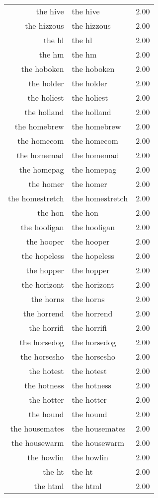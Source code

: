 \begin{table}[ht]
\begin{tabular}{rlr}
  the hive & the hive & 2.00 \\ 
  the hizzous & the hizzous & 2.00 \\ 
  the hl & the hl & 2.00 \\ 
  the hm & the hm & 2.00 \\ 
  the hoboken & the hoboken & 2.00 \\ 
  the holder & the holder & 2.00 \\ 
  the holiest & the holiest & 2.00 \\ 
  the holland & the holland & 2.00 \\ 
  the homebrew & the homebrew & 2.00 \\ 
  the homecom & the homecom & 2.00 \\ 
  the homemad & the homemad & 2.00 \\ 
  the homepag & the homepag & 2.00 \\ 
  the homer & the homer & 2.00 \\ 
  the homestretch & the homestretch & 2.00 \\ 
  the hon & the hon & 2.00 \\ 
  the hooligan & the hooligan & 2.00 \\ 
  the hooper & the hooper & 2.00 \\ 
  the hopeless & the hopeless & 2.00 \\ 
  the hopper & the hopper & 2.00 \\ 
  the horizont & the horizont & 2.00 \\ 
  the horns & the horns & 2.00 \\ 
  the horrend & the horrend & 2.00 \\ 
  the horrifi & the horrifi & 2.00 \\ 
  the horsedog & the horsedog & 2.00 \\ 
  the horsesho & the horsesho & 2.00 \\ 
  the hotest & the hotest & 2.00 \\ 
  the hotness & the hotness & 2.00 \\ 
  the hotter & the hotter & 2.00 \\ 
  the hound & the hound & 2.00 \\ 
  the housemates & the housemates & 2.00 \\ 
  the housewarm & the housewarm & 2.00 \\ 
  the howlin & the howlin & 2.00 \\ 
  the ht & the ht & 2.00 \\ 
  the html & the html & 2.00 \\ 

\end{tabular}
\end{table}
